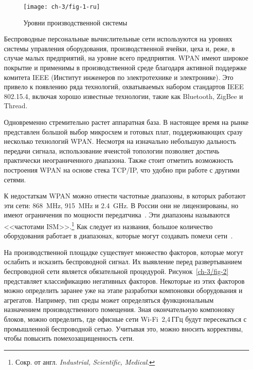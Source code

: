 \begin{figure*} [tb]
	\centering
	\texttt{[image: ch-3/fig-1-ru]}
	\caption{Уровни производственной системы}
	\label{ch-3/fig-1}
\end{figure*}

Беспроводные персональные вычислительные сети используются на уровнях системы управления оборудования, производственной ячейки, цеха и, реже, в случае малых предприятий, на уровне всего предприятия. WPAN имеют широкое покрытие и применимы в производственной среде благодаря активной поддержке комитета IEEE (Институт инженеров по электротехнике и электронике). Это привело к появлению ряда технологий, охватываемых набором стандартов IEEE 802.15.4, включая хорошо известные технологии, такие как Bluetooth, ZigBee и Thread.

Одновременно стремительно растет аппаратная база. В настоящее время на рынке представлен большой выбор микросхем и готовых плат, поддерживающих сразу несколько технологий WPAN. Несмотря на изначально небольшую дальность передачи сигнала, использование ячеистой топологии позволяет достичь практически неограниченного диапазона. Также стоит отметить возможность построения WPAN на основе стека TCP/IP, что удобно при работе с другими сетями.

К недостаткам WPAN можно отнести частотные диапазоны, в которых работают эти сети: \SI{868}{\mega\hertz}, \SI{915}{\mega\hertz} и \SI{2,4}{\giga\hertz}. В России они не лицензированы, но имеют ограничения по мощности передатчика~\cite{freq}. Эти диапазоны называются <<частотами ISM>>.\footnote{Сокр. от англ. \textit{Industrial, Scientific, Medical}.} Как следует из названия, большое количество оборудования работает в диапазонах, которые могут создавать помехи сети~\cite{750064, 6209430}.

На производственной площадке существует множество факторов, которые могут ослабить и исказить беспроводной сигнал. Их выявление перед развертыванием беспроводной сети является обязательной процедурой. Рисунок~\cref{ch-3/fig-2} представляет классификацию негативных факторов. Некоторые из этих факторов можно определить заранее уже на этапе разработки компоновки оборудования и агрегатов. Например, тип среды может определяться функциональным назначением производственного помещения. Зная окончательную компоновку блоков, можно определить, где офисные сети Wi-Fi~2,4\,ГГц будут пересекаться с промышленной беспроводной сетью. Учитывая это, можно вносить коррективы, чтобы повысить помехозащищенность сети.

